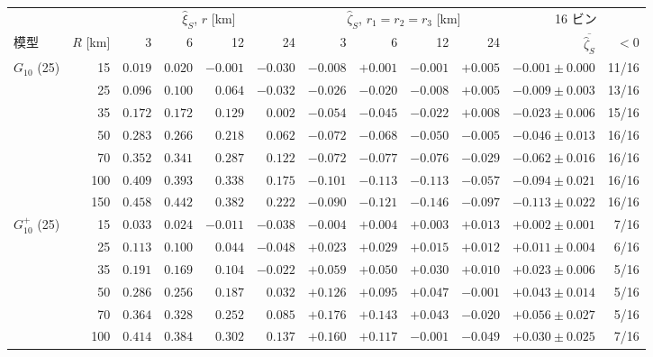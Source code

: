 \begin{tabular}{lrrrrrrrrrrr}
\toprule
& & \multicolumn{4}{c}{$\hat\xi_S$, $r$ [km]} & \multicolumn{4}{c}{$\hat\zeta_S$, $r_1 = r_2 = r_3$ [km]} & \multicolumn{2}{c}{16 ビン} \\
模型 & $R$ [km] & 3 & 6 & 12 & 24 & 3 & 6 & 12 & 24 & $\overline{\hat\zeta_S}$ & $< 0$ \\
\midrule
$G_{10}$ (25) & 15 & $0.019$ & $0.020$ & $-0.001$ & $-0.030$ & $-0.008$ & $+0.001$ & $-0.001$ & $+0.005$ & $-0.001 \pm 0.000$ & 11/16 \\
 & 25 & $0.096$ & $0.100$ & $0.064$ & $-0.032$ & $-0.026$ & $-0.020$ & $-0.008$ & $+0.005$ & $-0.009 \pm 0.003$ & 13/16 \\
 & 35 & $0.172$ & $0.172$ & $0.129$ & $0.002$ & $-0.054$ & $-0.045$ & $-0.022$ & $+0.008$ & $-0.023 \pm 0.006$ & 15/16 \\
 & 50 & $0.283$ & $0.266$ & $0.218$ & $0.062$ & $-0.072$ & $-0.068$ & $-0.050$ & $-0.005$ & $-0.046 \pm 0.013$ & 16/16 \\
 & 70 & $0.352$ & $0.341$ & $0.287$ & $0.122$ & $-0.072$ & $-0.077$ & $-0.076$ & $-0.029$ & $-0.062 \pm 0.016$ & 16/16 \\
 & 100 & $0.409$ & $0.393$ & $0.338$ & $0.175$ & $-0.101$ & $-0.113$ & $-0.113$ & $-0.057$ & $-0.094 \pm 0.021$ & 16/16 \\
 & 150 & $0.458$ & $0.442$ & $0.382$ & $0.222$ & $-0.090$ & $-0.121$ & $-0.146$ & $-0.097$ & $-0.113 \pm 0.022$ & 16/16 \\
\midrule
$G_{10}^{+}$ (25) & 15 & $0.033$ & $0.024$ & $-0.011$ & $-0.038$ & $-0.004$ & $+0.004$ & $+0.003$ & $+0.013$ & $+0.002 \pm 0.001$ & 7/16 \\
 & 25 & $0.113$ & $0.100$ & $0.044$ & $-0.048$ & $+0.023$ & $+0.029$ & $+0.015$ & $+0.012$ & $+0.011 \pm 0.004$ & 6/16 \\
 & 35 & $0.191$ & $0.169$ & $0.104$ & $-0.022$ & $+0.059$ & $+0.050$ & $+0.030$ & $+0.010$ & $+0.023 \pm 0.006$ & 5/16 \\
 & 50 & $0.286$ & $0.256$ & $0.187$ & $0.032$ & $+0.126$ & $+0.095$ & $+0.047$ & $-0.001$ & $+0.043 \pm 0.014$ & 5/16 \\
 & 70 & $0.364$ & $0.328$ & $0.252$ & $0.085$ & $+0.176$ & $+0.143$ & $+0.043$ & $-0.020$ & $+0.056 \pm 0.027$ & 5/16 \\
 & 100 & $0.414$ & $0.384$ & $0.302$ & $0.137$ & $+0.160$ & $+0.117$ & $-0.001$ & $-0.049$ & $+0.030 \pm 0.025$ & 7/16 \\

\end{tabular}
